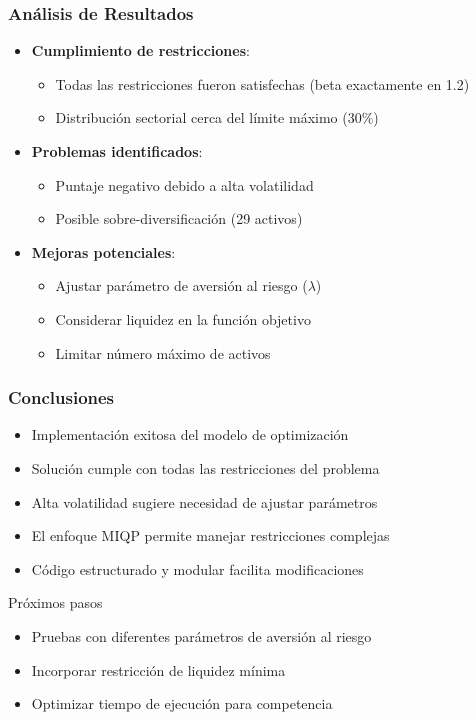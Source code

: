 \documentclass{beamer}
\begin{document}
\begin{frame}
\frametitle{Análisis de Resultados}
\begin{itemize}
\item \textbf{Cumplimiento de restricciones}:
\begin{itemize}
\item Todas las restricciones fueron satisfechas (beta exactamente en 1.2)
\item Distribución sectorial cerca del límite máximo (30\%)
\end{itemize}
\item \textbf{Problemas identificados}:
\begin{itemize}
\item Puntaje negativo debido a alta volatilidad
\item Posible sobre-diversificación (29 activos)
\end{itemize}
\item \textbf{Mejoras potenciales}:
\begin{itemize}
\item Ajustar parámetro de aversión al riesgo ($\lambda$)
\item Considerar liquidez en la función objetivo
\item Limitar número máximo de activos
\end{itemize}
\end{itemize}
\end{frame}

\begin{frame}
\frametitle{Conclusiones}
\begin{itemize}
\item Implementación exitosa del modelo de optimización
\item Solución cumple con todas las restricciones del problema
\item Alta volatilidad sugiere necesidad de ajustar parámetros
\item El enfoque MIQP permite manejar restricciones complejas
\item Código estructurado y modular facilita modificaciones
\end{itemize}

\begin{block}{Próximos pasos}
\begin{itemize}
\item Pruebas con diferentes parámetros de aversión al riesgo
\item Incorporar restricción de liquidez mínima
\item Optimizar tiempo de ejecución para competencia
\end{itemize}
\end{block}
\end{frame}
\end{document}
